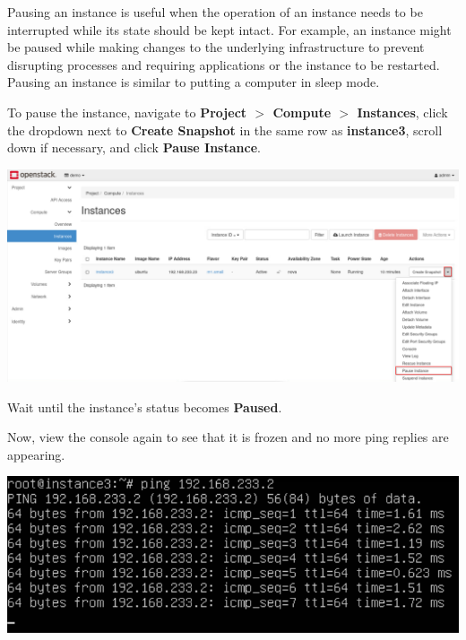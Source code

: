 \documentclass[letterpaper, 12pt]{article}
\begin{document}
\begin{enumerate}
    \begin{tipbox}
        Pausing an instance is useful when the operation of an instance needs to be interrupted while its state should be kept intact.
        For example, an instance might be paused while making changes to the underlying infrastructure to prevent disrupting processes and requiring applications or the instance to be restarted.
        Pausing an instance is similar to putting a computer in sleep mode.
    \end{tipbox}

    \begin{labstep}
        To pause the instance, navigate to \textbf{Project $>$ Compute $>$ Instances}, click the dropdown next to \textbf{Create Snapshot} in the same row as \textbf{instance3}, scroll down if necessary, and click \textbf{Pause Instance}.

        \begin{center}
            \includegraphics[width=\linewidth]{images/part3/step8.png}
        \end{center}
    \end{labstep}

    \begin{stopbox}
        Wait until the instance's status becomes \textbf{Paused}.
    \end{stopbox}

    \begin{labstep}
        Now, view the console again to see that it is frozen and no more ping replies are appearing.

        \begin{center}
            \includegraphics[width=\linewidth]{images/part3/step9.png}
        \end{center}
    \end{labstep}


\end{enumerate}
\end{document}
